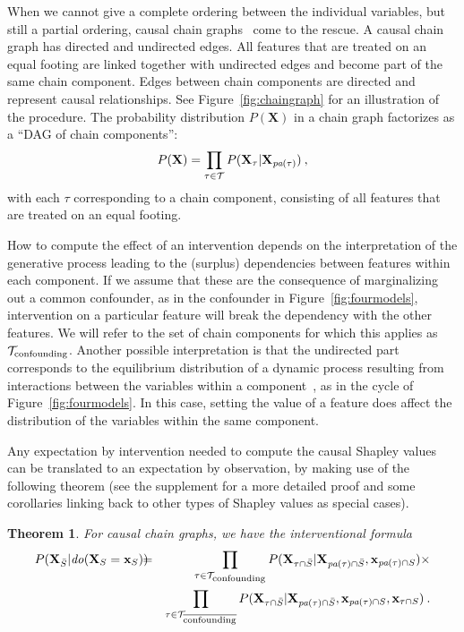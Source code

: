 \documentclass{article}
\newcommand{\vX}{\mathbf{X}}
\newcommand{\vx}{\mathbf{x}}
\newcommand{\dodo}{\mathit{do}}
\newcommand{\lvdo}[1]{\dodo(\vX_{#1} = \vx_{#1})}
\newcommand{\spa}{\mathop{\textit{\scriptsize pa}}}
\newcommand{\onder}[2]{{#1}_{\mbox{\scriptsize #2}}}
\newcommand{\isequal}{\hspace*{-2.5mm} & = & \hspace*{-2.5mm}}
\newcommand{\chaincomponents}{{\cal T}}
\newtheorem{theorem}{Theorem}
\begin{document}
When we cannot give a complete ordering between the individual variables, but still a partial ordering, 
causal chain graphs~\cite{lauritzen2002chain} come to the rescue. A causal chain graph has directed and undirected edges. All features that are treated on an equal footing are linked together with undirected edges and become part of the same chain component. Edges between chain components are directed and represent causal relationships. See Figure~\ref{fig:chaingraph} for an illustration of the procedure. The probability distribution $P(\vX)$ in a chain graph factorizes as a ``DAG of chain components'':
\[
P(\vX) = \prod_{\tau \in \chaincomponents} P(\vX_\tau|\vX_{\spa(\tau)}) \: ,
\]
with each $\tau$ corresponding to a chain component, consisting of all features that are treated on an equal footing.

How to compute the effect of an intervention depends on the interpretation of the generative process leading to the (surplus) dependencies between features within each component. If we assume that these are the consequence of marginalizing out a common confounder, as in the confounder in Figure~\ref{fig:fourmodels}, intervention on a particular feature will break the dependency with the other features. We will refer to the set of chain components for which this applies as $\onder{\chaincomponents}{confounding}$. Another possible interpretation is that the undirected part corresponds to the equilibrium distribution of a dynamic process resulting from interactions between the variables within a component~\cite{lauritzen2002chain}, as in the cycle of Figure~\ref{fig:fourmodels}. In this case, setting the value of a feature does affect the distribution of the variables within the same component.

Any expectation by intervention needed to compute the causal Shapley values can be translated to an expectation by observation, by making use of the following theorem (see the supplement for a more detailed proof and some corollaries linking back to other types of Shapley values as special cases).
\begin{theorem}
For causal chain graphs, we have the interventional formula 
\begin{eqnarray*}
P(\vX_{\bar{S}}|\lvdo{S}) \isequal \prod_{\tau \in \chaincomponents_{\textrm{\upshape \scriptsize confounding}}} P(\vX_{\tau \cap \bar{S}}|\vX_{\spa(\tau)  \cap \bar{S}},\vx_{\spa(\tau) \cap S}) \times \\
&& \prod_{\tau \in \chaincomponents_{\overline{\textrm{\upshape \scriptsize confounding}}}} P(\vX_{\tau \cap \bar{S}}|\vX_{\spa(\tau) \cap \bar{S}},\vx_{\spa(\tau) \cap S},\vx_{\tau \cap S}) \: .
\end{eqnarray*}
\end{theorem}
\end{document}
